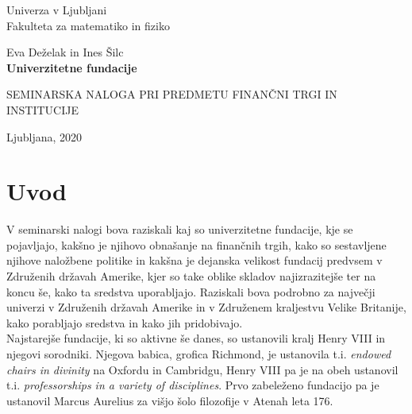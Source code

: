 \documentclass[12pt, a4paper]{article}
\begin{document}
\begin{titlepage}
\begin{center}

\large
Univerza v Ljubljani\\
\normalsize
Fakulteta za matematiko in fiziko\\

\vspace{3 cm} 

\large
Eva Deželak in Ines Šilc\\

\vspace{0.5cm}
\LARGE
\textbf{Univerzitetne fundacije}

\vspace{0.5 cm}
\normalsize


\vspace{1.5cm}
\normalsize
SEMINARSKA NALOGA PRI PREDMETU FINANČNI TRGI IN INSTITUCIJE

\vspace{3cm}


\vfill

\large Ljubljana, 2020

\end{center}
\end{titlepage}

\newpage

\tableofcontents

\listoffigures

\newpage

\section{Uvod}

V seminarski nalogi bova raziskali kaj so univerzitetne fundacije, kje se pojavljajo, kakšno je njihovo obnašanje na finančnih trgih, kako so sestavljene njihove naložbene politike in kakšna je dejanska velikost fundacij predvsem v Združenih državah Amerike, kjer so take oblike skladov najizrazitejše ter na koncu še, kako ta sredstva uporabljajo. Raziskali bova podrobno za največji univerzi v Združenih državah Amerike in v Združenem kraljestvu Velike Britanije, kako porabljajo sredstva in kako jih pridobivajo.\\

Najstarejše fundacije, ki so aktivne še danes, so ustanovili kralj Henry VIII in njegovi sorodniki. Njegova babica, grofica Richmond, je ustanovila t.i. \textit{endowed chairs in divinity} na Oxfordu in Cambridgu, Henry VIII pa je na obeh ustanovil t.i. \textit{professorships in a variety of disciplines}. Prvo zabeleženo fundacijo pa je ustanovil Marcus Aurelius za višjo šolo filozofije v Atenah leta 176. \cite{Investopedia}
\end{document}
